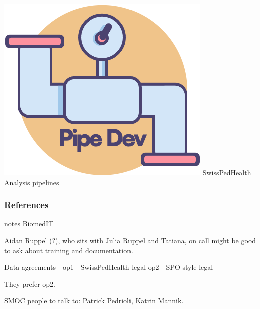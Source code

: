\documentclass[11pt]{beamer}
\begin{document}
\begin{frame}[standout]
\vspace{4em}
\begin{center}
\includegraphics[height=.12\textheight,valign=c]{SwissPedHealth_Pipeline_Devs.png}
\hspace{0em}
SwissPedHealth Analysis pipelines
\end{center}    
\vspace{4em}

\cite{Povysil2019rare}
\end{frame}

\begin{frame}[allowframebreaks]
       \frametitle{References}
        \renewcommand*{\bibfont}{\tiny}
%
%
\printbibliography[heading=none]

   
\end{frame}

\begin{frame}{notes}
BiomedIT

Aidan Ruppel (?), who sits with Julia Ruppel and Tatiana, on call might be good to ask about training and documentation. 

Data agreements - 
op1 - SwissPedHealth legal
op2 - SPO style legal

They prefer op2. 

SMOC people to talk to: Patrick Pedrioli, Katrin Mannik.  

\end{frame}
\end{document}
